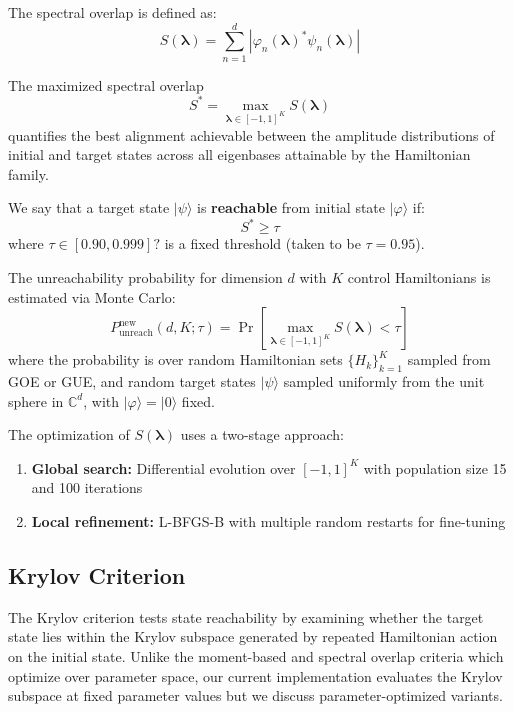 \documentclass[ a4paper, 
                amsfonts, 
                amssymb, 
                amsmath, 
                reprint, 
                showkeys, 
                nofootinbib,
                superscriptaddress, 
                onecolumn, 
                notitlepage,
                aps,
                pra,
                longbibliography]{revtex4-1}
\theoremstyle{definition}
\begin{document}
The  spectral overlap is defined as:
\begin{equation}
S(\boldsymbol{\lambda}) = \sum_{n=1}^d \left|\varphi_n(\boldsymbol{\lambda})^* \psi_n(\boldsymbol{\lambda})\right|
\label{eq:spectral_overlap_correct}
\end{equation}

The maximized spectral overlap
\begin{equation}
S^* = \max_{\boldsymbol{\lambda} \in [-1,1]^K} S(\boldsymbol{\lambda})
\end{equation}
quantifies the best alignment achievable between the amplitude distributions of initial and target states across all eigenbases attainable by the Hamiltonian family.

We say that a target state $|\psi\rangle$ is \textbf{reachable} from initial state $|\varphi\rangle$ if:
\begin{equation}
S^* \geq \tau
\end{equation}
where $\tau \in [0.90, 0.999]?$ is a fixed threshold (taken to be $\tau = 0.95$).

The unreachability probability for dimension $d$ with $K$ control Hamiltonians is estimated via Monte Carlo:
\begin{equation}
P_{\text{unreach}}^{\text{new}}(d, K; \tau) = \Pr\left[ \max_{\boldsymbol{\lambda} \in [-1,1]^K} S(\boldsymbol{\lambda}) < \tau \right]
\end{equation}
where the probability is over random Hamiltonian sets $\{H_k\}_{k=1}^K$ sampled from GOE or GUE, and random target states $|\psi\rangle$ sampled uniformly from the unit sphere in $\mathbb{C}^d$, with $|\varphi\rangle = |0\rangle$ fixed.

The optimization of $S(\boldsymbol{\lambda})$ uses a two-stage approach:
\begin{enumerate}
    \item \textbf{Global search:} Differential evolution over $[-1,1]^K$ with population size 15 and 100 iterations
    \item \textbf{Local refinement:} L-BFGS-B with multiple random restarts for fine-tuning
\end{enumerate}

 \subsection{Krylov Criterion}

The Krylov criterion tests state reachability by examining whether the target state lies within the Krylov subspace generated by repeated Hamiltonian action on the initial state. Unlike the moment-based and spectral overlap criteria which optimize over parameter space, our current implementation evaluates the Krylov subspace at fixed parameter values but we discuss parameter-optimized variants.
\end{document}
